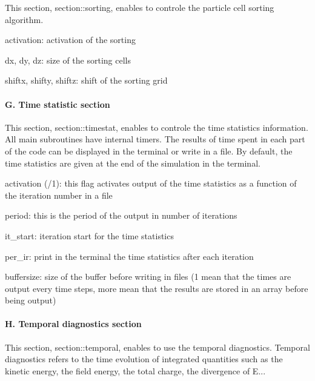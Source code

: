 This section, {\ttfamily section\+::sorting}, enables to controle the particle cell sorting algorithm.


\begin{DoxyItemize}
\item {\ttfamily activation}\+: activation of the sorting
\item {\ttfamily dx}, {\ttfamily dy}, {\ttfamily dz}\+: size of the sorting cells
\item {\ttfamily shiftx}, {\ttfamily shifty}, {\ttfamily shiftz}\+: shift of the sorting grid
\end{DoxyItemize}

\paragraph*{G. Time statistic section}

This section, {\ttfamily section\+::timestat}, enables to controle the time statistics information. All main subroutines have internal timers. The results of time spent in each part of the code can be displayed in the terminal or write in a file. By default, the time statistics are given at the end of the simulation in the terminal.


\begin{DoxyItemize}
\item {\ttfamily activation} ({/1})\+: this flag activates output of the time statistics as a function of the iteration number in a file
\item {\ttfamily period}\+: this is the period of the output in number of iterations
\item {\ttfamily it\+\_\+start}\+: iteration start for the time statistics
\item {\ttfamily per\+\_\+ir}\+: print in the terminal the time statistics after each iteration
\item {\ttfamily buffersize}\+: size of the buffer before writing in files (1 mean that the times are output every time steps, more mean that the results are stored in an array before being output)
\end{DoxyItemize}

\paragraph*{H. Temporal diagnostics section}

This section, {\ttfamily section\+::temporal}, enables to use the temporal diagnostics. Temporal diagnostics refers to the time evolution of integrated quantities such as the kinetic energy, the field energy, the total charge, the divergence of E...


